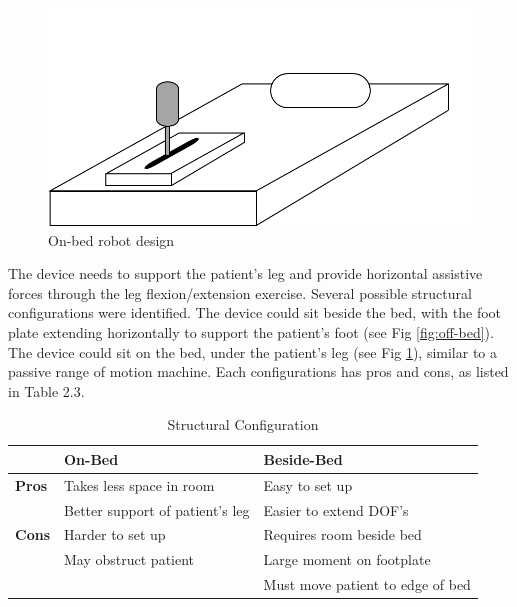 \documentclass[12pt]{report}
\begin{document}
	
		
	\begin{figure}[t] 
		\centering
		\includegraphics[width=0.75\linewidth]{on-bed}
		\caption{On-bed robot design}
		\label{fig:on-bed}
	\end{figure}	
	
		
		The device needs to support the patient's leg and provide horizontal assistive forces through the leg flexion/extension exercise. Several possible structural configurations were identified. The device could sit beside the bed, with the foot plate extending horizontally to support the patient's foot (see Fig \ref{fig:off-bed}). The device could sit on the bed, under the patient's leg (see Fig \ref{fig:on-bed}), similar to a passive range of motion machine. Each configurations has pros and cons, as listed in Table 2.3.

		
	\begin{table}[] \label{tab:config}
	\centering
	\caption{Structural Configuration }	
	\begin{tabular}{l|l|l}
		\hline
		& \textbf{On-Bed} & \textbf{Beside-Bed}  \\ \hline
		\textbf{Pros} & Takes less space in room  & Easy to set up  \\ 
		 & Better support of patient's leg  & Easier to extend DOF's \\ \hline
		 \textbf{Cons} & Harder to set up  & Requires room beside bed \\ 
		 & May obstruct patient  & Large moment on footplate \\ 
		 & & Must move patient to edge of bed \\ \hline

		\end{tabular}
	\label{tab:config}
	\end{table}
		
\end{document}
